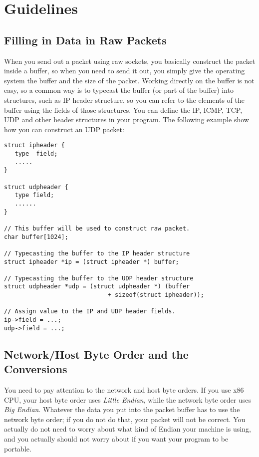 \section{Guidelines} 



\subsection{Filling in Data in Raw Packets}


When you send out a packet using raw sockets, you basically construct 
the packet inside a buffer, so when you need to send it out, you simply
give the operating system the buffer and the size of the packet. 
Working directly on the buffer is not easy, so a common way is to
typecast the buffer (or part of the buffer) into 
structures, such as IP header structure, so you can refer to the elements
of the buffer using the fields of those structures. 
You can define the IP, ICMP, TCP, UDP and other header structures in your 
program. The following example show how you can construct an UDP packet:

 
\begin{lstlisting}
struct ipheader {
   type  field;
   .....
}

struct udpheader {
   type field;
   ......
}

// This buffer will be used to construct raw packet.
char buffer[1024];

// Typecasting the buffer to the IP header structure
struct ipheader *ip = (struct ipheader *) buffer;

// Typecasting the buffer to the UDP header structure
struct udpheader *udp = (struct udpheader *) (buffer
                             + sizeof(struct ipheader));

// Assign value to the IP and UDP header fields.
ip->field = ...;
udp->field = ...;
\end{lstlisting}



\subsection{Network/Host Byte Order and the Conversions}


You need to pay attention to the network and host byte orders. If you use 
x86 CPU, your host byte order uses {\em Little Endian}, while 
the network byte order uses {\em Big Endian}. Whatever the data you put 
into the packet buffer has to use the network byte order; if you do not 
do that, your packet will not be correct. You actually do not need to worry
about what kind of Endian your machine is using, and you actually should not worry
about if you want your program to be portable. 


